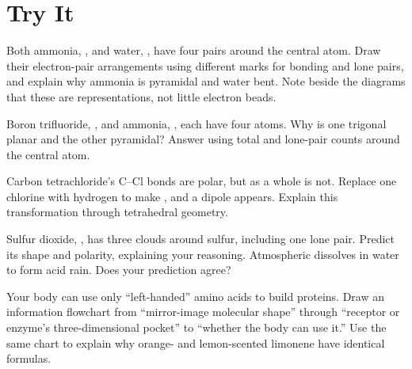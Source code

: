 \section*{Try It}

\begin{sikaoti}
\item Both ammonia, , and water, , have four pairs around the central atom. Draw their electron-pair arrangements using different marks for bonding and lone pairs, and explain why ammonia is pyramidal and water bent. Note beside the diagrams that these are representations, not little electron beads.
\item Boron trifluoride, , and ammonia, , each have four atoms. Why is one trigonal planar and the other pyramidal? Answer using total and lone-pair counts around the central atom.
\item Carbon tetrachloride's C--Cl bonds are polar, but  as a whole is not. Replace one chlorine with hydrogen to make , and a dipole appears. Explain this transformation through tetrahedral geometry.
\item Sulfur dioxide, , has three clouds around sulfur, including one lone pair. Predict its shape and polarity, explaining your reasoning. Atmospheric  dissolves in water to form acid rain. Does your prediction agree?
\item Your body can use only ``left-handed'' amino acids to build proteins. Draw an information flowchart from ``mirror-image molecular shape'' through ``receptor or enzyme's three-dimensional pocket'' to ``whether the body can use it.'' Use the same chart to explain why orange- and lemon-scented limonene have identical formulas.
\end{sikaoti}
